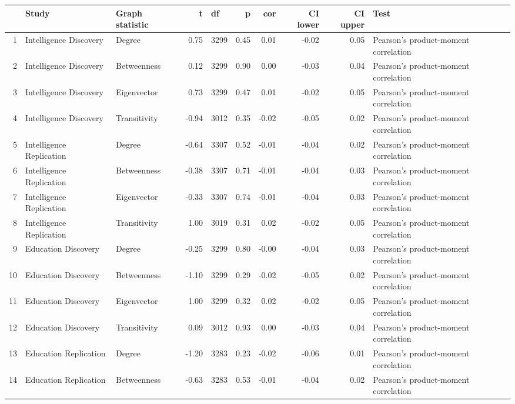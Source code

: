 \begin{table}[ht]
\centering
\begin{adjustbox}{max width=\textwidth}
\begin{tabular}{rllrlrrrrl}
  \hline
 & Study & Graph statistic & t & df & p & cor & CI lower & CI upper & Test \\ 
  \hline
1 & Intelligence Discovery & Degree & 0.75 & 3299 & 0.45 & 0.01 & -0.02 & 0.05 & Pearson's product-moment correlation \\ 
  2 & Intelligence Discovery & Betweenness & 0.12 & 3299 & 0.90 & 0.00 & -0.03 & 0.04 & Pearson's product-moment correlation \\ 
  3 & Intelligence Discovery & Eigenvector & 0.73 & 3299 & 0.47 & 0.01 & -0.02 & 0.05 & Pearson's product-moment correlation \\ 
  4 & Intelligence Discovery & Transitivity & -0.94 & 3012 & 0.35 & -0.02 & -0.05 & 0.02 & Pearson's product-moment correlation \\ 
  5 & Intelligence Replication & Degree & -0.64 & 3307 & 0.52 & -0.01 & -0.04 & 0.02 & Pearson's product-moment correlation \\ 
  6 & Intelligence Replication & Betweenness & -0.38 & 3307 & 0.71 & -0.01 & -0.04 & 0.03 & Pearson's product-moment correlation \\ 
  7 & Intelligence Replication & Eigenvector & -0.33 & 3307 & 0.74 & -0.01 & -0.04 & 0.03 & Pearson's product-moment correlation \\ 
  8 & Intelligence Replication & Transitivity & 1.00 & 3019 & 0.31 & 0.02 & -0.02 & 0.05 & Pearson's product-moment correlation \\ 
  9 & Education Discovery & Degree & -0.25 & 3299 & 0.80 & -0.00 & -0.04 & 0.03 & Pearson's product-moment correlation \\ 
  10 & Education Discovery & Betweenness & -1.10 & 3299 & 0.29 & -0.02 & -0.05 & 0.02 & Pearson's product-moment correlation \\ 
  11 & Education Discovery & Eigenvector & 1.00 & 3299 & 0.32 & 0.02 & -0.02 & 0.05 & Pearson's product-moment correlation \\ 
  12 & Education Discovery & Transitivity & 0.09 & 3012 & 0.93 & 0.00 & -0.03 & 0.04 & Pearson's product-moment correlation \\ 
  13 & Education Replication & Degree & -1.20 & 3283 & 0.23 & -0.02 & -0.06 & 0.01 & Pearson's product-moment correlation \\ 
  14 & Education Replication & Betweenness & -0.63 & 3283 & 0.53 & -0.01 & -0.04 & 0.02 & Pearson's product-moment correlation \\ 

\end{tabular}
\end{adjustbox}
\end{table}
